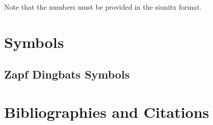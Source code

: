 Note that the numbers must be provided in the siunitx format.

%

\clearpage
\section{Symbols}
\begin{filecontents*}{\democodefile}
   \quad {}
            \quad {} 
\end{filecontents*}

\subsection{Zapf Dingbats Symbols}

%

\clearpage
\section{Bibliographies and Citations}


